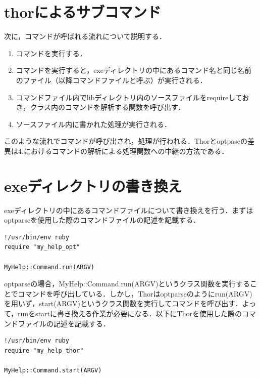 \section{thorによるサブコマンド}\label{thorux306bux3088ux308bux30b5ux30d6ux30b3ux30deux30f3ux30c9}

次に，コマンドが呼ばれる流れについて説明する．

\begin{enumerate}
\def\labelenumi{\arabic{enumi}.}
\tightlist
\item
  コマンドを実行する．
\item
  コマンドを実行すると，exeディレクトリの中にあるコマンド名と同じ名前のファイル（以降コマンドファイルと呼ぶ）が実行される．
\item
  コマンドファイル内でlibディレクトリ内のソースファイルをrequireしておき，クラス内のコマンドを解析する関数を呼び出す．
\item
  ソースファイル内に書かれた処理が実行される．
\end{enumerate}

このような流れでコマンドが呼び出され，処理が行われる．Thorとoptpaseの差異は4.におけるコマンドの解析による処理関数への中継の方法である．

\section{exeディレクトリの書き換え}\label{exeux30c7ux30a3ux30ecux30afux30c8ux30eaux306eux66f8ux304dux63dbux3048}

exeディレクトリの中にあるコマンドファイルについて書き換えを行う．まずはoptparseを使用した際のコマンドファイルの記述を記載する．

\begin{screen}
{\small
\begin{verbatim}
!/usr/bin/env ruby                                                                                                               
require "my_help_opt"

MyHelp::Command.run(ARGV)
\end{verbatim}}
\end{screen}

optparseの場合，MyHelp::Command.run(ARGV)というクラス関数を実行することでコマンドを呼び出している．しかし，Thorはoptparseのようにrun(ARGV)を用いず，start(ARGV)というクラス関数を実行してコマンドを呼び出す．よって，runをstartに書き換える作業が必要になる．以下にThorを使用した際のコマンドファイルの記述を記載する．

\begin{screen}
{\small
\begin{verbatim}
!/usr/bin/env ruby                                                                                                               
require "my_help_thor"

MyHelp::Command.start(ARGV)
\end{verbatim}}
\end{screen}

